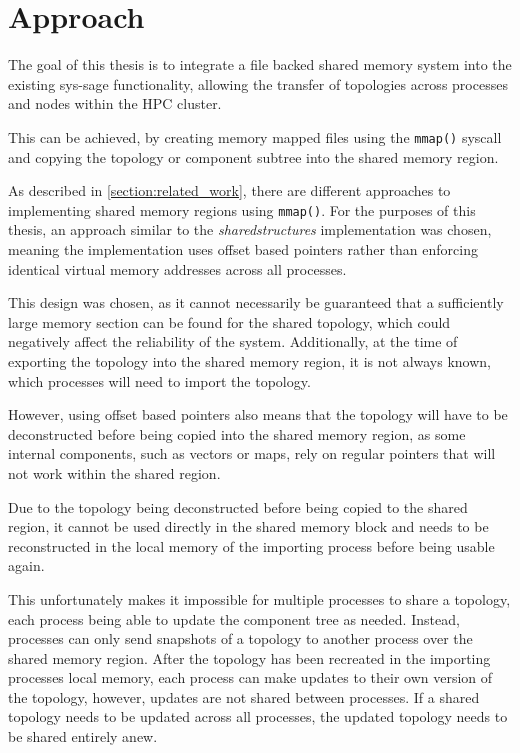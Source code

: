 \chapter{Approach}\label{chapter:evaluation}
The goal of this thesis is to integrate a file backed shared memory system into the existing sys-sage functionality,
allowing the transfer of topologies across processes and nodes within the HPC cluster.

This can be achieved, by creating memory mapped files using the \lstinline{mmap()} syscall and copying the topology or component subtree into the shared memory region.

As described in \autoref{section:related_work}, there are different approaches to implementing shared memory regions using \lstinline{mmap()}. For the purposes of this thesis,
an approach similar to the \emph{sharedstructures} implementation was chosen, meaning the implementation uses offset based pointers rather than enforcing identical virtual memory addresses across all processes.

This design was chosen, as it cannot necessarily be guaranteed that a sufficiently large memory section can be found for the shared topology, which could negatively affect the reliability of the system.
Additionally, at the time of exporting the topology into the shared memory region, it is not always known, which processes will need to import the topology.

However, using offset based pointers also means that the topology will have to be deconstructed before being copied into the shared memory region, as some internal components, such as vectors or maps,
rely on regular pointers that will not work within the shared region.

Due to the topology being deconstructed before being copied to the shared region,
it cannot be used directly in the shared memory block and needs to be reconstructed in the local memory of the importing process before being usable again.

This unfortunately makes it impossible for multiple processes to share a topology, each process being able to update the component tree as needed.
Instead, processes can only send snapshots of a topology to another process over the shared memory region. After the topology has been recreated in the importing processes local memory,
each process can make updates to their own version of the topology, however, updates are not shared between processes. If a shared topology needs to be updated across all processes,
the updated topology needs to be shared entirely anew.


